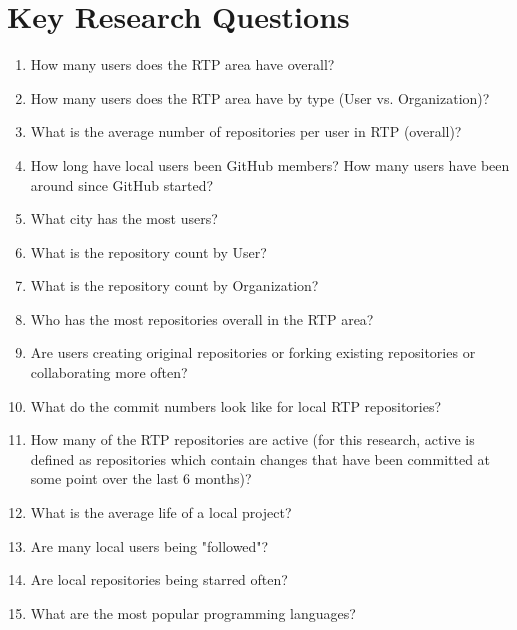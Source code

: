 \section{Key Research Questions}
\label{key-res-questions}
\begin{enumerate}
\item How many users does the RTP area have overall?
\item How many users does the RTP area have by type (User vs. Organization)?
\item What is the average number of repositories per user in RTP (overall)?
\item How long have local users been GitHub members? How many users have been around since GitHub started?
\item What city has the most users?
\item What is the repository count by User? 
\item What is the repository count by Organization?
\item Who has the most repositories overall in the RTP area?
\item Are users creating original repositories or forking existing repositories or collaborating more often?
\item What do the commit numbers look like for local RTP repositories?
\item How many of the RTP repositories are active (for this research, active is defined as repositories which contain changes that have been committed at some point over the last 6 months)?
\item What is the average life of a local project?
\item Are many local users being "followed"?
\item Are local repositories being starred often?
\item What are the most popular programming languages?
\end{enumerate}

